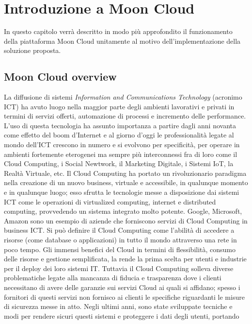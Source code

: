\chapter{Introduzione a Moon Cloud}\label{chp:01-introduction}
In questo capitolo verrà descritto in modo più approfondito il funzionamento della piattaforma Moon Cloud unitamente al 
motivo dell'implementazione della soluzione proposta.
%
\section{Moon Cloud overview}
La diffusione di sistemi \textit{Information and Communications Technology} (acronimo ICT) ha avuto luogo nella maggior parte degli ambienti 
lavorativi e privati in termini di servizi offerti, automazione di processi e incremento delle performance. L'uso di questa tecnologia 
ha assunto importanza a partire dagli anni novanta come effetto del boom d'Internet e al giorno d'oggi le professionalità legate al
mondo dell'ICT crescono in numero e si evolvono per specificità, per operare in ambienti fortemente eterogenei ma sempre più 
interconnessi fra di loro come il Cloud Computing, i Social Newtwork, il Marketing Digitale, i Sistemi IoT, la Realtà Virtuale, etc.
\vspace{0.5cm}\hfill\break
Il Cloud Computing ha portato un rivoluzionario paradigma nella creazione di un nuovo business, virtuale e accessibile, in qualunque momento
e in qualunque luogo; esso sfrutta le tecnologie messe a disposizione dai sistemi ICT come le operazioni di virtualized computing,
internet e distributed computing, provvedendo un sistema integrato molto potente. Google, Microsoft, Amazon sono un esempio di 
aziende che forniscono servizi di Cloud Computing in business ICT. Si può definire il Cloud Computing come l'abilità di accedere a 
risorse (come database o applicazioni) in tutto il mondo attraverso una rete in poco tempo.\hfill\break
Gli immensi benefici del Cloud in termini di flessibilità, consumo delle risorse e gestione semplificata, la rende la prima scelta per 
utenti e industrie per il deploy dei loro sistemi IT. Tuttavia il Cloud Computing solleva diverse problematiche legate alla mancanza di 
fiducia e trasparenza dove i clienti necessitano di avere delle garanzie sui servizi Cloud ai quali si affidano; spesso i fornitori di 
questi servizi non fornisco ai clienti le specifiche riguardanti le misure di sicurezza messe in atto.\hfill\break
Negli ultimi anni, sono state sviluppate tecniche e modi per rendere sicuri questi sistemi e proteggere i dati degli utenti, portando 
